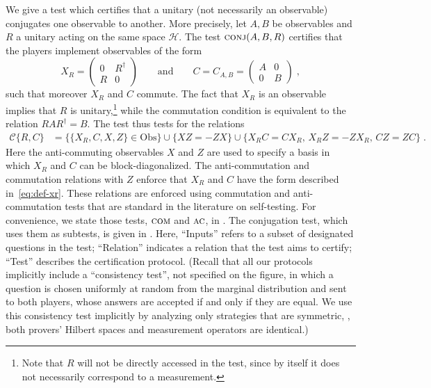 \documentclass{toc}
\newcommand{\setft}[1]{\mathrm{#1}}
\newcommand{\Obs}{\setft{Obs}}
\newcommand{\mH}{\mathcal{H}}
\newcommand{\conj}{\textsc{conj}}
\newcommand{\comt}{\textsc{com}}
\newcommand{\act}{\textsc{ac}}
\begin{document}
We give a test which certifies that a unitary (not necessarily an observable) conjugates one observable to another. More precisely, let $A,B$ be observables and $R$ a unitary acting on the same space $\mH$. The test $\conj(A,B,R)$ certifies that the players implement observables of the form
\begin{equation}\label{eq:def-xr}
X_R = \begin{pmatrix} 0 & R^\dagger\\ R & 0 \end{pmatrix}\qquad \text{and}\qquad C = C_{A,B} = \begin{pmatrix} A & 0\\ 0 & B \end{pmatrix}\;,
\end{equation}
such that moreover $X_R$ and $C$ commute. The fact that $X_R$ is an observable implies that $R$ is unitary,\footnote{Note that $R$ will not be directly accessed in the test, since by itself it does not necessarily correspond to a measurement.} while the commutation condition is equivalent to the relation $RAR^\dagger = B$. The test thus tests for the relations
\begin{align*}
 \mathcal{C}\{R,C\} &= \big\{ \{X_R,C,X,Z\}\in \Obs\big\} \cup \big\{XZ=-ZX\big\}
\cup \big\{ X_R C = C X_R,\, X_RZ=-Z X_R,\, C Z=ZC\big\}\;.
\end{align*}
Here the anti-commuting observables $X$ and $Z$ are used to specify a basis in which $X_R$ and $C$ can be block-diagonalized. The anti-commutation and commutation relations with $Z$ enforce that $X_R$ and $C$ have the form described in~\eqref{eq:def-xr}.
These relations are enforced using commutation and anti-commutation tests that are standard in the literature on self-testing. For convenience, we state those tests, $\comt$ and $\act$, in . The conjugation test, which uses them as subtests, is given in . Here, ``Inputs'' refers to a subset of designated questions in the test; ``Relation'' indicates a relation that the test aims to certify; ``Test'' describes the certification protocol. (Recall that all our protocols implicitly include a ``consistency test'', not specified on the figure, in which a question is chosen uniformly at random from the marginal distribution and sent to both players, whose answers are accepted if and only if they are equal. We use this consistency test implicitly by analyzing only strategies that are symmetric, \ie, both provers' Hilbert spaces and measurement operators are identical.)
\end{document}
